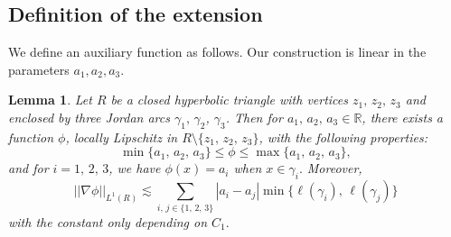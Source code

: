 \documentclass[reqno,11pt]{amsart}
\makeatletter
\newtheorem{lem}[thm]{Lemma}%
\numberwithin{equation}{section}
\theoremstyle{remark}
\makeatother
\begin{document}
% 



\subsection{Definition of the extension}


We define an auxiliary function as follows. Our construction is linear in the
parameters $a_1,a_2,a_3.$

\begin{lem}\label{axillary function}
Let $R$ be a closed hyperbolic triangle with vertices $z_1,\,z_2,\,z_3$ and enclosed by three Jordan arcs $\gamma_1,\,\gamma_2$, $\gamma_3$.  
Then for $a_1,\,a_2,\,a_3\in \mathbb R$, 
there exists a function $\phi$, locally Lipschitz in $R \setminus\{z_1,\,z_2,\,z_3\}$, with the following properties: 
\begin{equation}\label{bound of function}
\min\{a_1,\,a_2,\,a_3\} \le  \phi  \le \max\{a_1,\,a_2,\,a_3\},
\end{equation}
and for $i=1,\,2,\,3$, we have $\phi(x)=a_i$ when $x\in \gamma_i.$
Moreover, 
\begin{equation}\label{norm of function}
||\nabla \phi||_{L^{1}(R)}\lesssim \sum_{i,\,j\in\{1,\,2,\,3\}} |a_i-a_j|\min\{\ell(\gamma_{i}),\,\ell(\gamma_{j})\} 
\end{equation}
with the constant only depending on $C_1.$
\end{lem}
\end{document}
